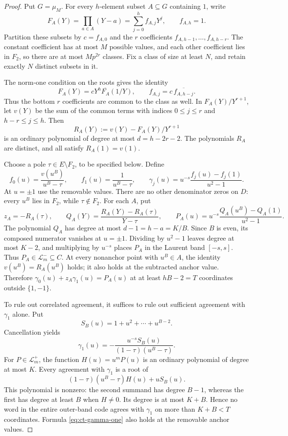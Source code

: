 \documentclass[11pt,letterpaper]{article}
\theoremstyle{definition}
\theoremstyle{remark}
\begin{document}
\begin{proof}
Put $G=\mu_M$. For every $h$-element subset $A\subseteq G$ containing $1$,
write
\[
 F_A(Y)=\prod_{a\in A}(Y-a)=\sum_{j=0}^h f_{A,j}Y^j,
 \qquad f_{A,h}=1.
\]
Partition these subsets by $c=f_{A,0}$ and the $r$ coefficients
$f_{A,h-1},\ldots,f_{A,h-r}$. The constant coefficient has at most $M$
possible values, and each other coefficient lies in $F_2$, so there are at
most $Mp^{2r}$ classes. Fix a class of size at least $N$, and retain exactly
$N$ distinct subsets in it.

The norm-one condition on the roots gives the identity
\begin{equation}\label{eq:ct-self-reciprocal}
 F_A(Y)=cY^h\overline{F_A}(1/Y),
 \qquad f_{A,j}=c\,\overline{f_{A,h-j}}.
\end{equation}
Thus the bottom $r$ coefficients are common to the class as well. In
$F_A(Y)/Y^{r+1}$, let $v(Y)$ be the sum of the common terms with indices
$0\le j\le r$ and $h-r\le j\le h$. Then
\[
 R_A(Y):=v(Y)-F_A(Y)/Y^{r+1}
\]
is an ordinary polynomial of degree at most $d=h-2r-2$. The polynomials
$R_A$ are distinct, and all satisfy $R_A(1)=v(1)$.

Choose a pole $\tau\in E\setminus F_2$, to be specified below. Define
\[
 f_0(u)=\frac{v(u^B)}{u^B-\tau},\qquad
 f_1(u)=\frac{1}{u^B-\tau},\qquad
 \gamma_j(u)=u^{-s}\frac{f_j(u)-f_j(1)}{u^2-1}.
\]
At $u=\pm1$ use the removable values. There are no other denominator
zeros on $D$: every $u^B$ lies in $F_2$, while $\tau\notin F_2$.
For each $A$, put
\[
 z_A=-R_A(\tau),\qquad
 Q_A(Y)=\frac{R_A(Y)-R_A(\tau)}{Y-\tau},\qquad
 P_A(u)=u^{-s}\frac{Q_A(u^B)-Q_A(1)}{u^2-1}.
\]
The polynomial $Q_A$ has degree at most $d-1=h-a=K/B$. Since $B$ is
even, its composed numerator vanishes at $u=\pm1$. Dividing by $u^2-1$
leaves degree at most $K-2$, and multiplying by $u^{-s}$ places $P_A$ in
the Laurent band $[-s,s]$. Thus $P_A\in\mathcal L^-_m\subseteq C$.
At every nonanchor point with $u^B\in A$, the identity
$v(u^B)=R_A(u^B)$ holds; it also holds at the subtracted anchor value.
Therefore $\gamma_0(u)+z_A\gamma_1(u)=P_A(u)$ at at least $hB-2=T$
coordinates outside $\{1,-1\}$.

To rule out correlated agreement, it suffices to rule out sufficient
agreement with $\gamma_1$ alone. Put
\[
 S_B(u)=1+u^2+\cdots+u^{B-2}.
\]
Cancellation yields
\begin{equation}\label{eq:ct-gamma-one}
 \gamma_1(u)=-\frac{u^{-s}S_B(u)}{(1-\tau)(u^B-\tau)}.
\end{equation}
For $P\in\mathcal L^+_m$, the function $H(u)=u^mP(u)$ is an ordinary
polynomial of degree at most $K$. Every agreement with $\gamma_1$ is a
root of
\begin{equation}\label{eq:ct-root-certificate}
 (1-\tau)(u^B-\tau)H(u)+uS_B(u).
\end{equation}
This polynomial is nonzero: the second summand has degree $B-1$, whereas
the first has degree at least $B$ when $H\ne0$. Its degree is at most
$K+B$. Hence no word in the entire outer-band code agrees with
$\gamma_1$ on more than $K+B<T$ coordinates. Formula
\eqref{eq:ct-gamma-one} also holds at the removable anchor values.


\end{proof}
\end{document}
